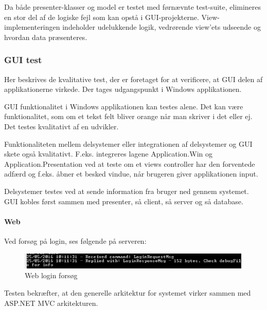 Da både presenter-klasser og model er testet med førnævnte test-suite, elimineres en stor del af de logiske fejl som kan opstå i GUI-projekterne. View-implementeringen indeholder udelukkende logik, vedrørende view’ets udseende og hvordan data præsenteres.

\subsubsection{GUI test}
Her beskrives de kvalitative test, der er foretaget for at verificere, at GUI delen af applikationerne virkede.
Der tages udgangspunkt i Windows applikationen.

GUI funktionalitet i Windows applikationen kan testes alene. Det kan være funktionalitet, som om et tekst felt bliver orange når man skriver i det eller ej. Det testes kvalitativt af en udvikler.

Funktionaliteten mellem delsystemer eller integrationen af delsystemer og GUI skete også kvalitativt.
F.eks. integreres lagene Application.Win og Application.Presentation ved at teste om et views controller har den forventede adfærd og f.eks. åbner et besked vindue, når brugeren giver applikationen input.

Delsystemer testes ved at sende information fra bruger ned gennem systemet. GUI kobles først sammen med presenter, så client, så server og så database.
\paragraph{Web}
Ved forsøg på login, ses følgende på serveren:

\begin{figure}
	\centering
	\includegraphics[width=1.0\linewidth]{figs/implementering/webtest}
	\caption{Web login forsøg}
	\label{fig:weblogintry}
\end{figure}

Testen bekræfter, at den generelle arkitektur for systemet virker sammen med ASP.NET MVC arkitekturen. 